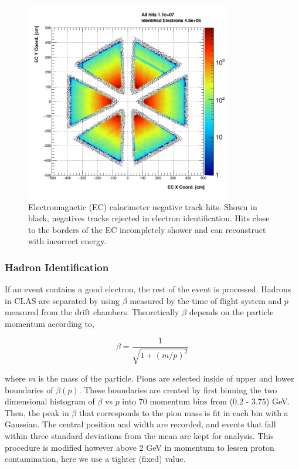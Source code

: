 \begin{figure}
  \centering
  \includegraphics[width=9cm]{image/ECFiducial.png}
  \caption{Electromagnetic (EC) calorimeter negative track hits.  Shown in black, negatives tracks rejected in electron identification.  Hits close to the borders of the EC incompletely shower and can reconstruct with incorrect energy.}
  \label{fig:ecfid}
\end{figure}

\subsubsection{Hadron Identification}
If an event contains a good electron, the rest of the event is processed.  Hadrons in CLAS are separated by using $\beta$ measured by the time of flight system and $p$ measured from the drift chambers.  Theoretically $\beta$ depends on the particle momentum according to, 

\begin{equation}
	\beta = \frac{1}{\sqrt{1 + (m/p)^2}}
\end{equation}

where $m$ is the mass of the particle.  Pions are selected inside of upper and lower boundaries of $\beta(p)$.  These boundaries are created by first binning the two dimensional histogram of $\beta$ vs $p$ into 70 momentum bins from (0.2 - 3.75) GeV.  Then, the peak in $\beta$ that corresponds to the pion mass is fit in each bin with a Gaussian.  The central position and width are recorded, and events that fall within three standard deviations from the mean are kept for analysis.  This procedure is modified however above 2 GeV in momentum to lessen proton contamination, here we use a tighter (fixed) value.    

